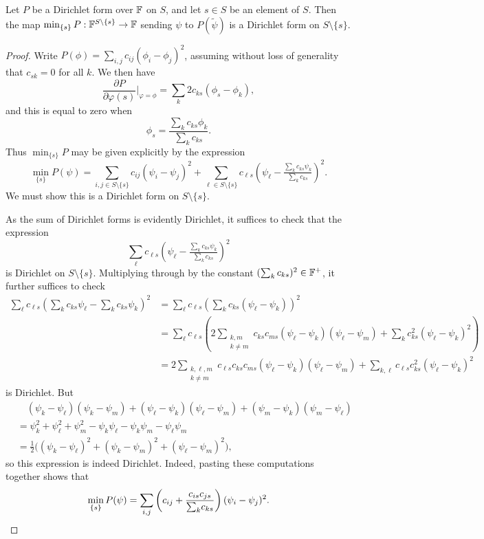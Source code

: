 \begin{lemma} \label{lem:onestepdirichletmin}
  Let $P$ be a Dirichlet form over ${\mathbb F}$ on $S$, and let $s \in S$ be an element
  of $S$. Then the map $\min_{\{s\}} P:{\mathbb F}^{S \setminus\{s\}} \to {\mathbb F}$ sending
  $\psi$ to $P(\tilde\psi)$ is a Dirichlet form on $S \setminus \{s\}$.
\end{lemma}
\begin{proof}
  Write $P(\phi) = \sum_{i,j} c_{ij}(\phi_i -\phi_j)^2$, assuming without loss
  of generality that $c_{sk} =0$ for all $k$. We then have
  \[
    \frac{\partial P}{\partial \varphi(s)}\bigg\vert_{\varphi = \phi} = \sum_k
    2c_{ks}(\phi_s-\phi_k),
  \]
  and this is equal to zero when
  \[
    \phi_s = \frac{\sum_k c_{ks}\phi_k}{\sum_k c_{ks}}.
  \]
  Thus $\min_{\{s\}}P$ may be given explicitly by the expression
  \[
    \min_{\{s\}} P(\psi) = \sum_{i,j \in S \setminus \{s\}} c_{ij}(\psi_i -\psi_j)^2 +
    \sum_{\ell \in S \setminus \{s\}} c_{\ell s}\left(\psi_\ell - \tfrac{\sum_k
      c_{ks} \psi_k}{\sum_k c_{ks}}\right)^2.
  \]
  We must show this is a Dirichlet form on $S \setminus \{s\}$. 
  
  As the sum of Dirichlet forms is evidently Dirichlet, it suffices to check that the expression 
  \[
    \sum_\ell c_{\ell s}\left(\psi_\ell - \tfrac{\sum_k c_{ks} \psi_k}{\sum_k
      c_{ks}}\right)^2
  \]
  is Dirichlet on $S \setminus \{s\}$. Multiplying through by the constant
  $(\sum_k c_{ks})^2 \in {\mathbb F}^+$, it further suffices to check
  \begin{align*}
    \sum_\ell c_{\ell s}\left(\sum_k c_{ks} \psi_\ell - \sum_k c_{ks}
    \psi_k\right)^2 &= \sum_\ell c_{\ell s} \left(\sum_k c_{ks} (\psi_\ell -
    \psi_k)\right)^2 \\
    &= \sum_\ell c_{\ell s} \left(2 \sum_{\substack{k,m \\ k \ne m}} c_{k s} c_{ms}
    (\psi_\ell-\psi_k)(\psi_\ell - \psi_m) + \sum_{k} c_{k
    s}^2(\psi_\ell-\psi_k)^2\right) \\
    &= 2\sum_{\substack{k,\ell,m \\ k \ne m}} c_{\ell s} c_{k s} c_{ms}
    (\psi_\ell-\psi_k)(\psi_\ell - \psi_m) + \sum_{k, \ell} c_{\ell s}c_{k
    s}^2(\psi_\ell-\psi_k)^2
  \end{align*}
  is Dirichlet. But
  \begin{align*}
    &\quad (\psi_k - \psi_\ell)(\psi_k - \psi_m)+(\psi_\ell - \psi_k)(\psi_\ell -
    \psi_m) + (\psi_m-\psi_k)(\psi_m-\psi_\ell) \\ 
    &= \psi_k^2+\psi_\ell^2+\psi_m^2-\psi_k\psi_\ell- \psi_k\psi_m -
    \psi_\ell\psi_m \\
    &= \tfrac12\big( (\psi_k-\psi_\ell)^2 +(\psi_k-\psi_m)^2
    +(\psi_\ell-\psi_m)^2\big),
  \end{align*}
  so this expression is indeed Dirichlet. Indeed, pasting these computations
  together shows that
  \[
    \min_{\{s\}}P(\psi) = \sum_{i,j} \left(c_{ij}+\frac{c_{is}c_{js}}{{\textstyle \sum_k}
    c_{ks}}\right)(\psi_i-\psi_j)^2. \qedhere
  \]
\end{proof}

